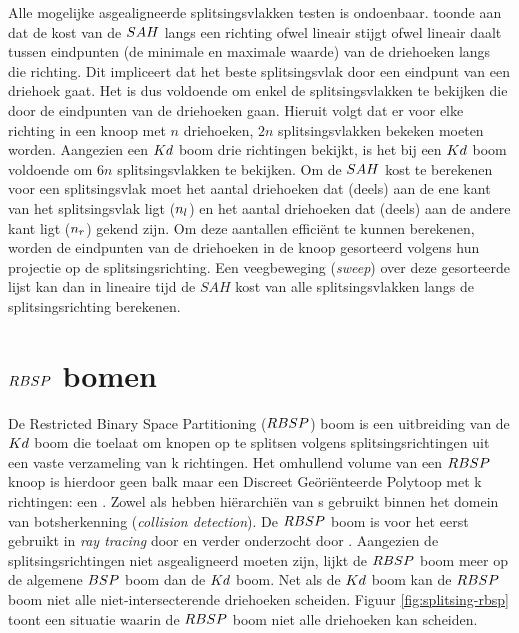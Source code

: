     Alle mogelijke asgealigneerde splitsingsvlakken testen is ondoenbaar. 
    \authorHavran{} \cite{havran2000heuristic} toonde aan dat de kost van de $SAH$ langs een richting ofwel lineair stijgt ofwel lineair daalt tussen eindpunten (de minimale en maximale waarde) van de driehoeken langs die richting.
    Dit impliceert dat het beste splitsingsvlak door een eindpunt van een driehoek gaat.
    Het is dus voldoende om enkel de splitsingsvlakken te bekijken die door de eindpunten van de driehoeken gaan.
    Hieruit volgt dat er voor elke richting in een knoop met $n$ driehoeken, $2n$ splitsingsvlakken bekeken moeten worden.
    Aangezien een $Kd$ boom drie richtingen bekijkt, is het bij een $Kd$ boom voldoende om $6n$ splitsingsvlakken te bekijken.
    Om de $SAH$ kost te berekenen voor een splitsingsvlak moet het aantal driehoeken dat (deels) aan de ene kant van het splitsingsvlak ligt ($n_l$) en het aantal driehoeken dat (deels) aan de andere kant ligt ($n_r$) gekend zijn.
    Om deze aantallen efficiënt te kunnen berekenen, worden de eindpunten van de driehoeken in de knoop gesorteerd volgens hun projectie op de splitsingsrichting.
    Een veegbeweging (\textit{sweep}) over deze gesorteerde lijst kan dan in lineaire tijd de $SAH$ kost van alle splitsingsvlakken langs de splitsingsrichting berekenen.

\section{$RBSP$ bomen}
    De Restricted Binary Space Partitioning ($RBSP$) boom is een uitbreiding van de $Kd$ boom die toelaat om knopen op te splitsen volgens splitsingsrichtingen uit een vaste verzameling van k richtingen.
    Het omhullend volume van een $RBSP$ knoop is hierdoor geen balk maar een Discreet Geöriënteerde Polytoop met k richtingen: een \symKDOP.
    Zowel \authorKlosowki{} \cite{klosowski1998efficient} als \authorZachmann{} \cite{zachmann1998rapid} hebben hiërarchiën van \symKDOP s gebruikt binnen het domein van botsherkenning (\textit{collision detection}).
    De $RBSP$ boom is voor het eerst gebruikt in \textit{ray tracing} door \authorKammaje{} \cite{Kammaje} en verder onderzocht door \authorBudge{} \cite{Budge}.
    Aangezien de splitsingsrichtingen niet asgealigneerd moeten zijn, lijkt de $RBSP$ boom meer op de algemene $BSP$ boom dan de $Kd$ boom. Net als de $Kd$ boom kan de $RBSP$ boom niet alle niet-intersecterende driehoeken scheiden. 
    Figuur \ref{fig:splitsing-rbsp} toont een situatie waarin de $RBSP$ boom niet alle driehoeken kan scheiden.
    \\

